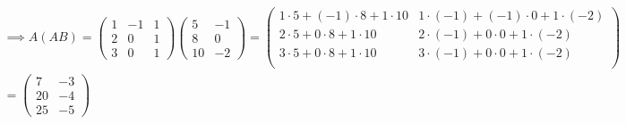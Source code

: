 \documentclass[a4paper, 10pt]{article}
\begin{document}
\begin{solution}
    \begin{multline*}
        \implies A(AB) =  \begin{pmatrix}
                1 & -1 & 1 \\
                2 & 0  & 1 \\
                3 & 0  & 1
            \end{pmatrix}\begin{pmatrix}
                5  & -1 \\
                8  & 0  \\
                10 & -2
            \end{pmatrix}
        = \begin{pmatrix}
                1 \cdot 5 + (-1) \cdot 8 + 1 \cdot 10 & 1 \cdot (-1) + (-1) \cdot 0 + 1 \cdot (-2) \\
                2 \cdot 5 + 0 \cdot 8 + 1 \cdot 10    & 2 \cdot (-1) + 0 \cdot 0 + 1 \cdot (-2)    \\
                3 \cdot 5 + 0 \cdot 8 + 1 \cdot 10    & 3 \cdot (-1) + 0 \cdot 0 + 1 \cdot (-2)    \\
            \end{pmatrix}
        \\
        = \begin{pmatrix}
                7  & -3 \\
                20 & -4 \\
                25 & -5
            \end{pmatrix}
    \end{multline*}


\end{solution}
\end{document}
